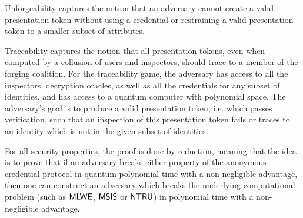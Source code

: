 Unforgeability captures the notion that an adversary cannot create a valid 
presentation token without using a credential or restraining a valid 
presentation token to a smaller subset of attributes.

Traceability captures the notion that all presentation tokens, even 
when computed by a collusion of users and inspectors, should trace to a 
member of the forging coalition. For the traceability game, the 
adversary has access to all the inspectors' decryption oracles, as well 
as all the credentials for any subset of identities, and has access to a 
quantum computer with polynomial space. The adversary's goal is to 
produce a valid presentation token, i.e. which passes verification, such 
that an inspection of this presentation token fails or traces to an 
identity which is not in the given subset of identities. 





For all security properties, the proof is done by reduction, meaning 
that the idea is to prove that if an adversary breaks either property of 
the anonymous credential protocol in quantum polynomial time with a 
non-negligible advantage, then one can construct an adversary which breaks 
the underlying computational problem (such as $\mathsf{MLWE}$, $\mathsf{MSIS}$ or $\mathsf{NTRU}$) in polynomial time with a non-negligible advantage.


